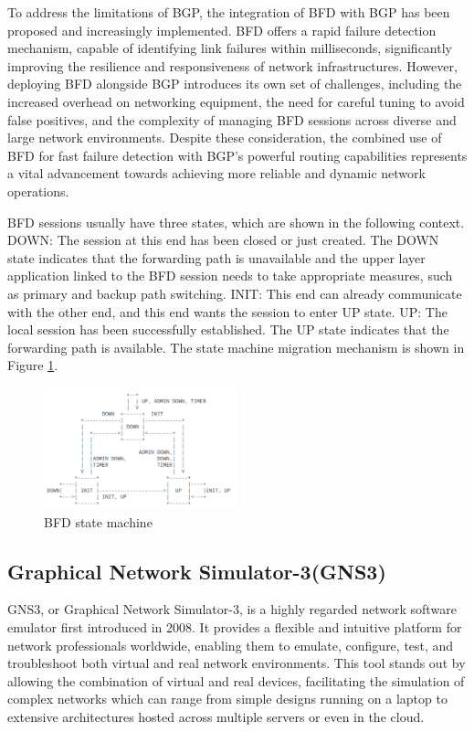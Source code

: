 \documentclass[12pt]{article}
\begin{document}
To address the limitations of BGP, the integration of BFD with BGP has been proposed and increasingly implemented. BFD offers a rapid failure detection mechanism, capable of identifying link failures within milliseconds, significantly improving the resilience and responsiveness of network infrastructures. However, deploying BFD alongside BGP introduces its own set of challenges, including the increased overhead on networking equipment, the need for careful tuning to avoid false positives, and the complexity of managing BFD sessions across diverse and large network environments. Despite these consideration, the combined use of BFD for fast failure detection with BGP's powerful routing capabilities represents a vital advancement towards achieving more reliable and dynamic network operations.

BFD sessions usually have three states, which are shown in the following context. DOWN: The session at this end has been closed or just created. The DOWN state indicates that the forwarding path is unavailable and the upper layer application linked to the BFD session needs to take appropriate measures, such as primary and backup path switching. INIT: This end can already communicate with the other end, and this end wants the session to enter UP state. UP: The local session has been successfully established. The UP state indicates that the forwarding path is available. The state machine migration mechanism is shown in Figure \ref{fig:example}.

\begin{figure}[h]
    \centering
    \includegraphics[width=0.5\textwidth]{Graph/BFD state machine.png}
    \caption{BFD state machine \cite{ref4}} 
    \label{fig:example} 
    
\end{figure}


\subsection{Graphical Network Simulator-3(GNS3)}
GNS3, or Graphical Network Simulator-3, is a highly regarded network software emulator first introduced in 2008\cite{ref5}. It provides a flexible and intuitive platform for network professionals worldwide, enabling them to emulate, configure, test, and troubleshoot both virtual and real network environments. This tool stands out by allowing the combination of virtual and real devices, facilitating the simulation of complex networks which can range from simple designs running on a laptop to extensive architectures hosted across multiple servers or even in the cloud.
\end{document}
